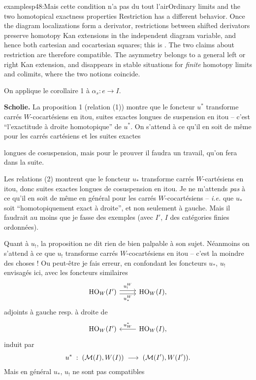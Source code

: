 \begin{dcomment}{examples}{p48:Mais cette condition n'a pas du tout l'air}{Ordinary limits and the two homotopical exactness properties}
Restriction has a different behavior. Once the diagram localizations form a derivator, restrictions between shifted derivators preserve homotopy Kan extensions in the independent diagram variable, and hence both cartesian and cocartesian squares; this is \citet[Proposition~2.5]{Groth2013}. The two claims about restriction are therefore compatible. The asymmetry belongs to a general left or right Kan extension, and disappears in stable situations for \emph{finite} homotopy limits and colimits, where the two notions coincide.
\end{dcomment}


On applique le corollaire 1 à $\alpha_s : e \longrightarrow I$.

\textbf{Scholie.} La proposition 1 (relation (1)) montre que le foncteur $u^*$ transforme carrés $W$-cocartésiens en itou, suites exactes longues de suspension en itou – c'est “l'exactitude à droite homotopique” de $u^*$. On s'attend à ce qu'il en soit de même pour les carrés cartésiens et les suites exactes

\noindent{}

\noindent longues de cosuspension, mais pour le prouver il faudra un travail, qu'on fera dans la suite.

Les relations (2) montrent que le foncteur $u_*$ transforme carrés $W$-cartésiens en itou, donc suites exactes longues de cosuspension en itou. Je ne m'attends \textit{pas} à ce qu'il en soit de même en général pour les carrés $W$-cocartésiens – \textit{i.e.} que $u_*$ soit “homotopiquement exact à droite”, et non seulement à gauche. Mais il faudrait au moins que je fasse des exemples (avec $I'$, $I$ des catégories finies ordonnées).

Quant à $u_{!}$, la proposition ne dit rien de bien palpable à son sujet. Néanmoins on s'attend à ce que $u_{!}$ transforme carrés $W$-cocartésiens en itou – c'est la moindre des choses ! Ou peut-être je fais erreur, en confondant les foncteurs $u_*$, $u_{!}$ envisagés ici, avec les foncteurs similaires
\[
\begin{tikzcd}
\HO_W(I') \arrow[r, shift left, "u_{!}^W"] \arrow[r, shift right, "u_*^W"'] & \HO_W(I),
\end{tikzcd}
\]
adjoints à gauche resp. à droite de
\[
\begin{tikzcd}
\HO_W(I') & \HO_W(I), \arrow[l, "u_W^*"']
\end{tikzcd}
\]
induit par
\[
u^* \;:\; (\mathcal{M}(I),W(I)) \;\longrightarrow\; (\mathcal{M}(I'),W(I')).
\]
Mais en général $u_*$, $u_{!}$ ne sont pas compatibles

